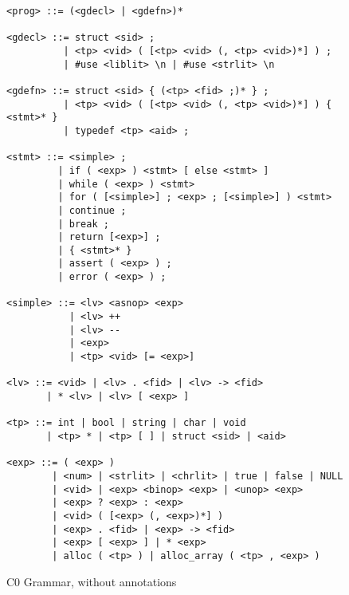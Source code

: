 \documentclass[11pt]{article}
\begin{document}
\begin{figure}
\begin{small}
\begin{verbatim}
<prog> ::= (<gdecl> | <gdefn>)*

<gdecl> ::= struct <sid> ;
          | <tp> <vid> ( [<tp> <vid> (, <tp> <vid>)*] ) ;
          | #use <liblit> \n | #use <strlit> \n

<gdefn> ::= struct <sid> { (<tp> <fid> ;)* } ;
          | <tp> <vid> ( [<tp> <vid> (, <tp> <vid>)*] ) { <stmt>* }
          | typedef <tp> <aid> ;

<stmt> ::= <simple> ;
         | if ( <exp> ) <stmt> [ else <stmt> ]
         | while ( <exp> ) <stmt>
         | for ( [<simple>] ; <exp> ; [<simple>] ) <stmt>
         | continue ;
         | break ;
         | return [<exp>] ;
         | { <stmt>* }
         | assert ( <exp> ) ;
         | error ( <exp> ) ; 

<simple> ::= <lv> <asnop> <exp>
           | <lv> ++
           | <lv> --
           | <exp>
           | <tp> <vid> [= <exp>]

<lv> ::= <vid> | <lv> . <fid> | <lv> -> <fid>
       | * <lv> | <lv> [ <exp> ]

<tp> ::= int | bool | string | char | void
       | <tp> * | <tp> [ ] | struct <sid> | <aid>

<exp> ::= ( <exp> )
        | <num> | <strlit> | <chrlit> | true | false | NULL
        | <vid> | <exp> <binop> <exp> | <unop> <exp>
        | <exp> ? <exp> : <exp>
        | <vid> ( [<exp> (, <exp>)*] )
        | <exp> . <fid> | <exp> -> <fid>
        | <exp> [ <exp> ] | * <exp>
        | alloc ( <tp> ) | alloc_array ( <tp> , <exp> )
\end{verbatim}
\end{small}
\caption{C0 Grammar, without annotations}
\label{fig:grammar}
\end{figure}
\end{document}
